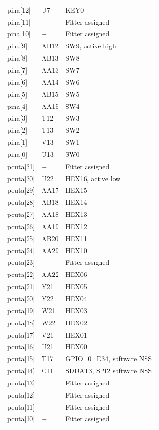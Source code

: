 \documentclass[12pt]{article}
\begin{document}
\begin{longtable}{lll}
pina[12]  & U7       & KEY0\\
pina[11]  & $-$      & Fitter assigned \\
pina[10]  & $-$      & Fitter assigned \\
pina[9]   & AB12     & SW9, active high \\
pina[8]   & AB13     & SW8 \\
pina[7]   & AA13     & SW7 \\
pina[6]   & AA14     & SW6 \\
pina[5]   & AB15     & SW5 \\
pina[4]   & AA15     & SW4 \\
pina[3]   & T12      & SW3 \\
pina[2]   & T13      & SW2 \\
pina[1]   & V13      & SW1 \\
pina[0]   & U13      & SW0 \\
pouta[31] & $-$      & Fitter assigned \\
pouta[30] & U22      & HEX16, active low \\
pouta[29] & AA17     & HEX15 \\
pouta[28] & AB18     & HEX14 \\
pouta[27] & AA18     & HEX13 \\
pouta[26] & AA19     & HEX12 \\
pouta[25] & AB20     & HEX11 \\
pouta[24] & AA29     & HEX10 \\
pouta[23] & $-$      & Fitter assigned \\
pouta[22] & AA22     & HEX06 \\
pouta[21] & Y21      & HEX05 \\
pouta[20] & Y22      & HEX04 \\
pouta[19] & W21      & HEX03 \\
pouta[18] & W22      & HEX02 \\
pouta[17] & V21      & HEX01 \\
pouta[16] & U21      & HEX00 \\
pouta[15] & T17      & GPIO\_0\_D34, software NSS \\
pouta[14] & C11      & SDDAT3, SPI2 software NSS \\
pouta[13] & $-$      & Fitter assigned \\
pouta[12] & $-$      & Fitter assigned \\
pouta[11] & $-$      & Fitter assigned \\
pouta[10] & $-$      & Fitter assigned \\

\end{longtable}
\end{document}
